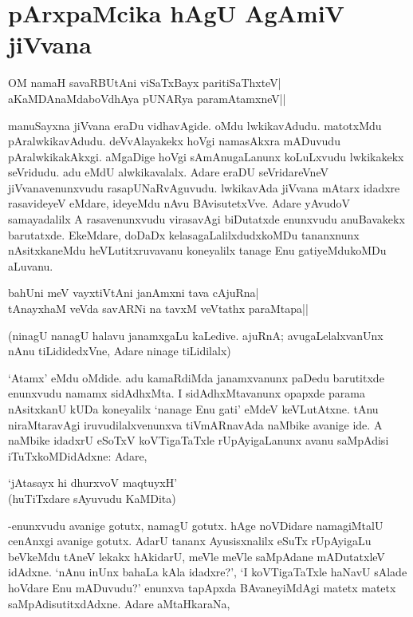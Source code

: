 \chapter{pArxpaMcika hAgU AgAmiV jiVvana}

\begin{shloka}
OM namaH savaRBUtAni viSaTxBayx paritiSaThxteV|\\
aKaMDAnaMdaboVdhAya pUNARya paramAtamxneV||
\end{shloka}

manuSayxna jiVvana eraDu vidhavAgide. oMdu lwkikavAdudu. matotxMdu pAralwkikavAdudu. deVvAlayakekx hoVgi namasAkxra mADuvudu pAralwkikakAkxgi. aMgaDige hoVgi sAmAnugaLanunx koLuLxvudu lwkikakekx seVridudu. adu eMdU alwkikavalalx. Adare eraDU seVridareVneV jiVvanavenunxvudu rasapUNaRvAguvudu. lwkikavAda jiVvana mAtarx idadxre rasavideyeV eMdare, ideyeMdu nAvu BAvisutetxVve. Adare yAvudoV samayadalilx A rasavenunxvudu virasavAgi biDutatxde enunxvudu anuBavakekx barutatxde. EkeMdare, doDaDx kelasagaLalilxdudxkoMDu tananxnunx nAsitxkaneMdu heVLutitxruvavanu koneyalilx tanage Enu gatiyeMdukoMDu aLuvanu.

\begin{shloka}
bahUni meV vayxtiVtAni janAmxni tava cAjuRna|\\
tAnayxhaM veVda savARNi na tavxM veVtathx paraMtapa||
\end{shloka} 

(ninagU nanagU halavu janamxgaLu kaLedive. ajuRnA; avugaLelalxvanUnx nAnu tiLididedxVne, Adare ninage tiLidilalx)

`Atamx' eMdu oMdide. adu kamaRdiMda janamxvanunx paDedu barutitxde enunxvudu namamx sidAdhxMta. I sidAdhxMtavanunx opapxde parama nAsitxkanU kUDa koneyalilx `nanage Enu gati' eMdeV keVLutAtxne. tAnu niraMtaravAgi iruvudilalxvenunxva tiVmARnavAda naMbike avanige ide. A naMbike idadxrU eSoTxV koVTigaTaTxle rUpAyigaLanunx avanu saMpAdisi iTuTxkoMDidAdxne: Adare,

\begin{shloka}
`jAtasayx hi dhurxvoV maqtuyxH'\\
(huTiTxdare sAyuvudu KaMDita)
\end{shloka}

-enunxvudu avanige gotutx, namagU gotutx. hAge noVDidare namagiMtalU cenAnxgi avanige gotutx. AdarU tananx Ayusisxnalilx eSuTx rUpAyigaLu beVkeMdu tAneV lekakx hAkidarU, meVle meVle saMpAdane mADutatxleV idAdxne. `nAnu inUnx bahaLa kAla idadxre?', `I koVTigaTaTxle haNavU sAlade hoVdare Enu mADuvudu?' enunxva tapApxda BAvaneyiMdAgi matetx matetx saMpAdisutitxdAdxne. Adare aMtaHkaraNa,

